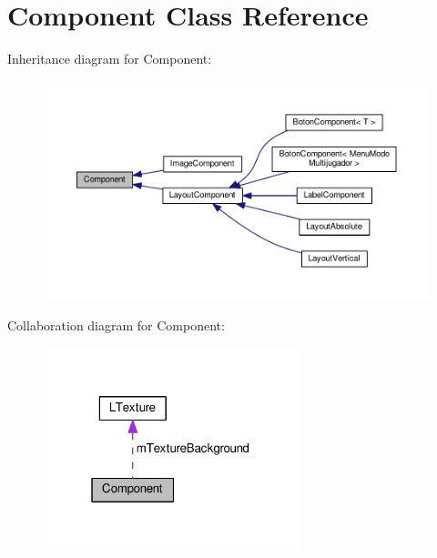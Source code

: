 \hypertarget{class_component}{}\section{Component Class Reference}
\label{class_component}


Inheritance diagram for Component\+:
\nopagebreak
\begin{figure}[H]
\begin{center}
\leavevmode
\includegraphics[width=350pt]{class_component__inherit__graph}
\end{center}
\end{figure}


Collaboration diagram for Component\+:\nopagebreak
\begin{figure}[H]
\begin{center}
\leavevmode
\includegraphics[width=211pt]{class_component__coll__graph}
\end{center}
\end{figure}
